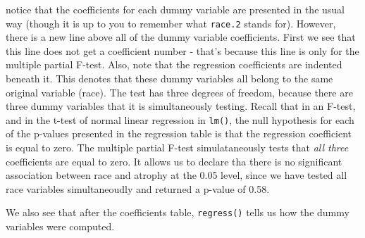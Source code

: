 \documentclass[landscape]{article}
\begin{document}
notice that the coefficients for each dummy variable are presented in the usual way (though it is up to you to remember what \texttt{race.2} stands for). However, there is a new line above all of the dummy variable coefficients. First we see that this line does not get a coefficient number - that's because this line is only for the multiple partial F-test. Also, note that the regression coefficients are indented beneath it. This denotes that these dummy variables all belong to the same original variable (race). The test has three degrees of freedom, because there are three dummy variables that it is simultaneously testing. Recall that in an F-test, and in the t-test of normal linear regression in \texttt{lm()}, the null hypothesis for each of the p-values presented in the regression table is that the regression coefficient is equal to zero. The multiple partial F-test simulataneously tests that \emph{all three} coefficients are equal to zero. It allows us to declare tha there is no significant association between race and atrophy at the 0.05 level, since we have tested all race variables simultaneoudly and returned a p-value of 0.58. 

We also see that after the coefficients table, \texttt{regress()} tells us how the dummy variables were computed. 
\end{document}
